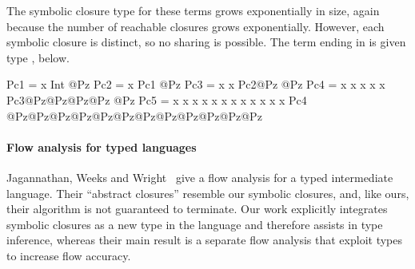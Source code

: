 \documentclass[11pt,final]{iuthesis}
\begin{document}
The symbolic closure type for these terms grows exponentially in size, again because 
the number of reachable closures grows exponentially. However, each symbolic closure
is distinct, so no sharing is possible. The term ending in 
is given type , below.

\begin{cljlisting}
Pc1 = {x Int}                                      @Pz
Pc2 = {x Pc1}                                      @Pz
Pc3 = {x {x Pc2}@Pz}                               @Pz
Pc4 = {x {x {x {x {x Pc3}@Pz}@Pz}@Pz}@Pz}          @Pz
Pc5 = {x {x {x {x {x {x {x {x {x {x {x {x Pc4}
       @Pz}@Pz}@Pz}@Pz}@Pz}@Pz}@Pz}@Pz}@Pz}@Pz}@Pz}@Pz
                                        
\end{cljlisting}

\paragraph{Flow analysis for typed languages}
Jagannathan, Weeks and Wright~\cite{jagannathan1997type}
give a flow analysis for a typed intermediate language.
Their ``abstract closures'' resemble our symbolic closures,
and, like ours, their algorithm is not guaranteed to terminate.
Our work explicitly integrates symbolic closures as a new type
in the language and therefore assists in type inference,
whereas their main result is a separate flow analysis that 
exploit types to increase flow accuracy.




%
\end{document}
